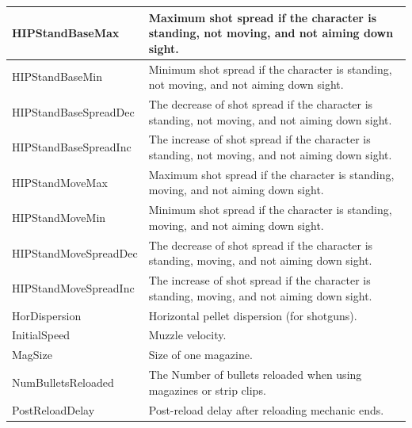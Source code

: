 \documentclass[MGS,Master,english]{twbook}%
\begin{document}
\begin{longtable}[c]{|l|p{10.5cm}|}
	HIPStandBaseMax        & Maximum shot spread if the character is standing, not moving, and not aiming down sight.                                       \\ \hline
	HIPStandBaseMin        & Minimum shot spread if the character is standing, not moving, and not aiming down sight.                                       \\ \hline
	HIPStandBaseSpreadDec  & The decrease of shot spread if the character is standing, not moving, and not aiming down sight.                               \\ \hline
	HIPStandBaseSpreadInc  & The increase of shot spread if the character is standing, not moving, and not aiming down sight.                               \\ \hline
	HIPStandMoveMax        & Maximum shot spread if the character is standing, moving, and not aiming down sight.                                           \\ \hline
	HIPStandMoveMin        & Minimum shot spread if the character is standing, moving, and not aiming down sight.                                           \\ \hline
	HIPStandMoveSpreadDec  & The decrease of shot spread if the character is standing, moving, and not aiming down sight.                                   \\ \hline
	HIPStandMoveSpreadInc  & The increase of shot spread if the character is standing, moving, and not aiming down sight.                                   \\ \hline
	HorDispersion          & Horizontal pellet dispersion (for shotguns).                                                                                   \\ \hline
	InitialSpeed           & Muzzle velocity.                                                                                                               \\ \hline
	MagSize                & Size of one magazine.                                                                                                          \\ \hline
	NumBulletsReloaded     & The Number of bullets reloaded when using magazines or strip clips.                                                            \\ \hline
	PostReloadDelay        & Post-reload delay after reloading mechanic ends.                                                                               \\ \hline

\end{longtable}
\end{document}
